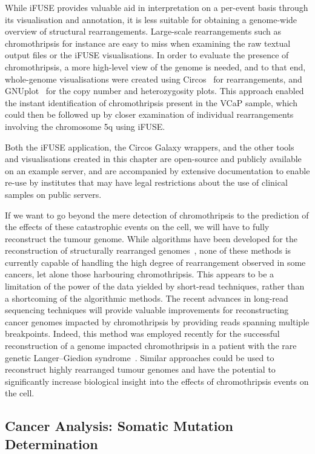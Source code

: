 While iFUSE provides valuable aid in interpretation on a per-event basis through its visualisation and annotation, it is less suitable for obtaining a genome-wide overview of structural rearrangements. Large-scale rearrangements such as chromothripsis for instance are easy to miss when examining the raw textual output files or the iFUSE visualisations. In order to evaluate the presence of chromothripsis, a more high-level view of the genome is needed, and to that end, whole-genome visualisations were created using Circos~\cite{circos} for rearrangements, and GNUplot~\cite{url-gnuplot} for the copy number and heterozygosity plots. This approach enabled the instant identification of chromothripsis present in the VCaP sample, which could then be followed up by closer examination of individual rearrangements involving the chromosome 5q using iFUSE.

Both the iFUSE application, the Circos Galaxy wrappers, and the other tools and visualisations created in this chapter are open-source and publicly available on an example server, and are accompanied by extensive documentation to enable re-use by institutes that may have legal restrictions about the use of clinical samples on public servers.

If we want to go beyond the mere detection of chromothripsis to the prediction of the effects of these catastrophic events on the cell, we will have to fully reconstruct the tumour genome.
While algorithms have been developed for the reconstruction of structurally rearranged genomes~\cite{prego,Baca2013}, none of these methods is currently capable of handling the high degree of rearrangement observed in some cancers, let alone those harbouring chromothripsis.
This appears to be a limitation of the power of the data yielded by short-read techniques, rather than a shortcoming of the algorithmic methods.
The recent advances in long-read sequencing techniques will provide valuable improvements for reconstructing cancer genomes impacted by chromothripsis by providing reads spanning multiple breakpoints.
Indeed, this method was employed recently for the successful reconstruction of a genome impacted chromothripsis in a patient with the rare genetic Langer–Giedion syndrome~\cite{lei2020long}.
Similar approaches could be used to reconstruct highly rearranged tumour genomes and have the potential to significantly increase biological insight into the effects of chromothripsis events on the cell.

\subsection{Cancer Analysis: Somatic Mutation Determination}

